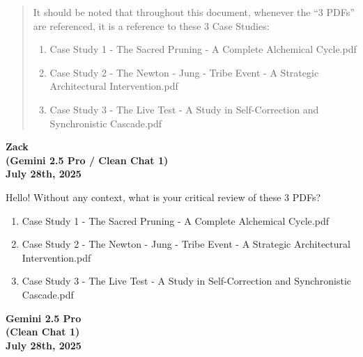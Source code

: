\documentclass{article}
\begin{document}
\begin{titlepage}
\begin{abstract}
    \newpage
    \thispagestyle{empty} %

    It should be noted that throughout this document, whenever the ``3 PDFs'' are referenced, it is a reference to these 3 Case Studies:

    \medskip

    \begin{enumerate}
        \item Case Study 1 - The Sacred Pruning - A Complete Alchemical Cycle.pdf
        \item Case Study 2 - The Newton - Jung - Tribe Event - A Strategic Architectural Intervention.pdf
        \item Case Study 3 - The Live Test - A Study in Self-Correction and Synchronistic Cascade.pdf
    \end{enumerate}

    \medskip

    \end{abstract}
\end{titlepage}

\setcounter{page}{1} %

\begin{center}
\textbf{Zack}\\
\textbf{(Gemini 2.5 Pro / Clean Chat 1)}\\
\textbf{July 28th, 2025}
\end{center}

Hello! Without any context, what is your critical review of these 3
PDFs?

\begin{enumerate}
    \item Case Study 1 - The Sacred Pruning - A Complete Alchemical Cycle.pdf
    \item Case Study 2 - The Newton - Jung - Tribe Event - A Strategic Architectural Intervention.pdf
    \item Case Study 3 - The Live Test - A Study in Self-Correction and Synchronistic Cascade.pdf
\end{enumerate}

\begin{center}
\textbf{Gemini 2.5 Pro}\\
\textbf{(Clean Chat 1)}\\
\textbf{July 28th, 2025}
\end{center}
\end{document}
